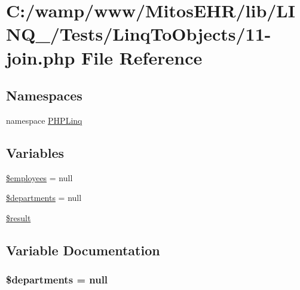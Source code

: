 \hypertarget{_linq_to_objects_211-join_8php}{\section{\-C\-:/wamp/www/\-Mitos\-E\-H\-R/lib/\-L\-I\-N\-Q\-\_/\-Tests/\-Linq\-To\-Objects/11-\/join.php \-File \-Reference}
\label{_linq_to_objects_211-join_8php}
}
\subsection*{\-Namespaces}
\begin{DoxyCompactItemize}
\item 
namespace \hyperlink{namespace_p_h_p_linq}{\-P\-H\-P\-Linq}
\end{DoxyCompactItemize}
\subsection*{\-Variables}
\begin{DoxyCompactItemize}
\item 
\hyperlink{_linq_to_objects_211-join_8php_a598c06abe9d65a9d2990e39693ce2c27}{\$employees} = null
\item 
\hyperlink{_linq_to_objects_211-join_8php_ae2ea4305886b612a4ca8efa178aaec9c}{\$departments} = null
\item 
\hyperlink{_linq_to_objects_211-join_8php_a112ef069ddc0454086e3d1e6d8d55d07}{\$result}
\end{DoxyCompactItemize}


\subsection{\-Variable \-Documentation}
\hypertarget{_linq_to_objects_211-join_8php_ae2ea4305886b612a4ca8efa178aaec9c}{
\subsubsection[{\$departments}]{\setlength{\rightskip}{0pt plus 5cm}\$departments = null}}\label{_linq_to_objects_211-join_8php_ae2ea4305886b612a4ca8efa178aaec9c}


